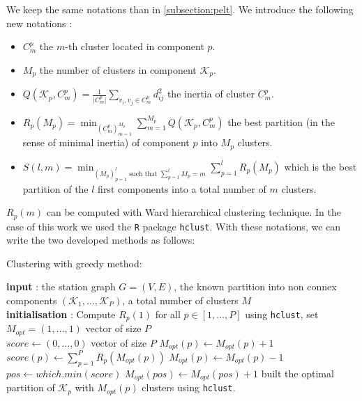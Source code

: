 \begin{appendices}
We keep the same notations than in \ref{subsection:pelt}. We introduce the following new notations : 
\begin{itemize}
    \item $C_m^p$ the $m$-th cluster located in component $p$.
    \item $M_p$ the number of clusters in component $\mathcal{K}_p$.
    \item $\displaystyle Q(\mathcal{K}_p,C_m^p) = \frac{1}{\lvert C_m^p\rvert}\sum_{v_i,v_j \in C_m^p}d_{ij}^2$ the inertia of cluster $C^p_m$.
    \item $\displaystyle R_p(M_p) = \min_{(C_m^p)_{m=1}^{M_p}}\sum_{m = 1}^{M_p}Q(\mathcal{K}_p,C_m^p)$ the best partition (in the sense of minimal inertia) of component $p$ into $M_p$ clusters. 
    \item $\displaystyle S(l,m) = \min_{(M_p)_{p=1}^l \text{ such that } \sum_{p=1}^l M_p = m}\sum_{p=1}^lR_p(M_p)$ which is the best partition of the $l$ first components into a total number of $m$ clusters.
\end{itemize}

$R_p(m)$ can be computed with Ward hierarchical clustering technique. In the case of this work we used the \texttt{R} package \texttt{hclust}. With these notations, we can write the two developed methods as follows: 

\begin{algorithm}[ht]
\caption{Clustering with greedy method:}\label{algo:greed}
\begin{algorithmic}

\State \textbf{input} : the station graph $G=(V,E)$, the known partition into non connex components $(\mathcal{K_1},\dots,\mathcal{K}_P)$, a total number of clusters $M$ \\
  
\State \textbf{initialisation} : Compute $R_p(1)$ for all $p \in [1,\dots,P]$ using \texttt{hclust}, set $M_{opt} = (1,\dots,1)$ vector of size $P$  \\

  \State $\textit{score}\gets(0,\dots,0)$ vector of size $P$
  \State $M_{opt}(p) \gets M_{opt}(p) + 1$
  \State $\textit{score}(p) \gets \sum_{p=1}^P R_p(M_{opt}(p))$
  \State $M_{opt}(p) \gets M_{opt}(p) - 1$
  \EndFor
  \State $\textit{pos} \gets which.min(\textit{score})$
  \State $M_{opt}(pos) \gets M_{opt}(pos)+1$
\EndFor
{}
\State built the optimal partition of $\mathcal{K}_p$ with $M_{opt}(p)$ clusters using \texttt{hclust}.
\EndFor


\end{algorithmic}
\end{algorithm}
\end{appendices}
